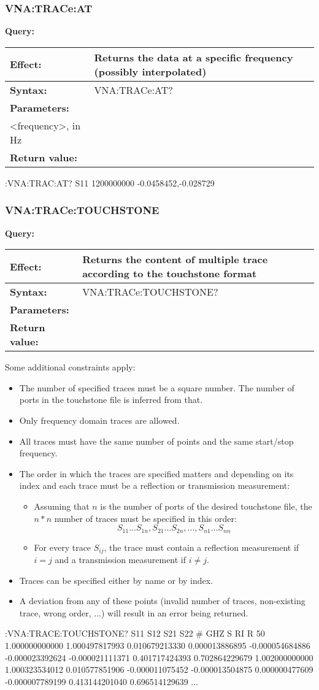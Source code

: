 \documentclass[a4paper,11pt]{article}
\newcommand{\query}[4]{
\noindent\textbf{Query:}
\begin{longtable}{p{.15\textwidth} | p{.80\textwidth} } 
\hline
\textbf{Effect:} & #1 \\ \hline
\textbf{Syntax:} & #2 \\ \hline 
\textbf{Parameters:} & \makecell[tl]{#3} \\ \hline
\textbf{Return value:} & \makecell[tl]{#4} \\ \hline
\end{longtable}
}
\begin{document}
\subsubsection{VNA:TRACe:AT}
\query{Returns the data at a specific frequency (possibly interpolated)}{VNA:TRACe:AT?}{<trace>, either by name or by index\\<frequency>, in Hz}{real,imag (or ``NaN,NaN'' if specified frequeny is invalid)}
\begin{example}
:VNA:TRAC:AT? S11 1200000000
-0.0458452,-0.028729
\end{example}

\subsubsection{VNA:TRACe:TOUCHSTONE}
\query{Returns the content of multiple trace according to the touchstone format}{VNA:TRACe:TOUCHSTONE?}{<trace1>,<trace2>,<trace3>,...}{Touchstone file content in ASCII}
Some additional constraints apply:
\begin{itemize}
\item The number of specified traces must be a square number. The number of ports in the touchstone file is inferred from that.
\item Only frequency domain traces are allowed.
\item All traces must have the same number of points and the same start/stop frequency.
\item The order in which the traces are specified matters and depending on its index and each trace must be a reflection or transmission measurement:
\begin{itemize}
\item Assuming that $n$ is the number of ports of the desired touchstone file, the $n*n$ number of traces must be specified in this order:
$$ S_{11}...S_{1n},S_{21}...S_{2n},...,S_{n1}...S_{nn} $$
\item For every trace $S_{ij}$, the trace must contain a reflection measurement if $i=j$ and a transmission measurement if $i\neq j$.
\end{itemize}
\item Traces can be specified either by name or by index.
\item A deviation from any of these points (invalid number of traces, non-existing trace, wrong order, ...) will result in an error being returned.
\end{itemize}
\begin{example}
:VNA:TRACE:TOUCHSTONE? S11 S12 S21 S22
# GHZ S RI R 50
1.000000000000 1.000497817993 0.010679213330 0.000013886895 -0.000054684886 -0.000023392624 -0.000021111371 0.401717424393 0.702864229679
1.002000000000 1.000323534012 0.010577851906 -0.000011075452 -0.000013504875 0.000000477609 -0.000007789199 0.413144201040 0.696514129639
...
\end{example}
\end{document}
